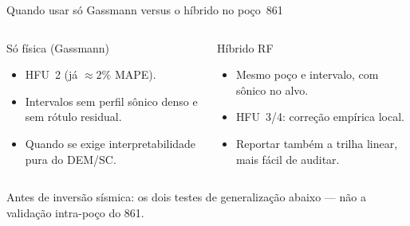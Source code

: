\documentclass[aspectratio=169,10pt]{beamer}
\begin{document}
\begin{frame}{Quando usar só Gassmann versus o híbrido no poço~861}
  \footnotesize
  \begin{columns}[T,onlytextwidth]
    \begin{block}{Só física (Gassmann)}
      \scriptsize
      \begin{itemize}
        \item HFU~2 (já $\approx 2\%$ MAPE).
        \item Intervalos sem perfil sônico denso e sem rótulo residual.
        \item Quando se exige interpretabilidade pura do DEM/SC.
      \end{itemize}
    \end{block}
    \begin{exampleblock}{Híbrido RF}
      \scriptsize
      \begin{itemize}
        \item Mesmo poço e intervalo, com sônico no alvo.
        \item HFU~3/4: correção empírica local.
        \item Reportar também a trilha linear, mais fácil de auditar.
      \end{itemize}
    \end{exampleblock}
  \end{columns}
  \vspace{0.10cm}
  {\scriptsize Antes de inversão sísmica: os dois testes de generalização
  abaixo --- não a validação intra-poço do 861.}
\end{frame}
\end{document}
